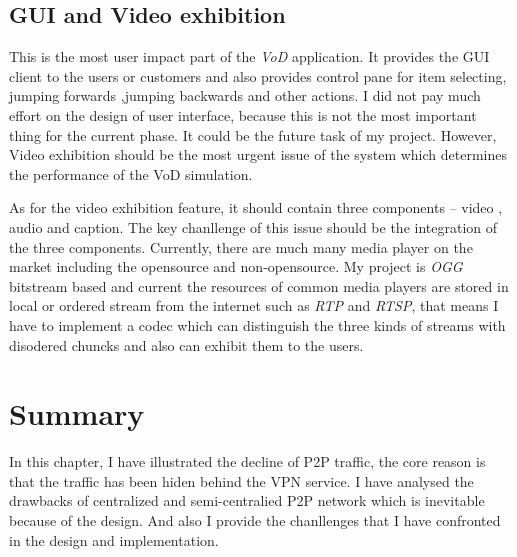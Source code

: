 \subsection{GUI and Video exhibition}
{
This is the most user impact part of the \emph{VoD} application. It provides the GUI client to the users or customers and also provides control pane for item selecting, jumping forwards ,jumping backwards and other actions.
I did not pay much effort on the design of user interface, because this is not the most important thing for the current phase. It could be the future task of my project.
However, Video exhibition should be the most urgent issue of the system which determines the performance of the VoD simulation.

As for the video exhibition feature, it should contain three components --  video , audio and caption.
The key chanllenge of this issue should be the integration of the three components.
Currently, there are much many media player on the market including the opensource and non-opensource.
My project is \emph{OGG} bitstream based and current the resources of common media players are stored in local or ordered stream from the internet such as \emph{RTP} and \emph{RTSP}, that means I have to implement a codec which can distinguish the three kinds of streams with disodered chuncks and also can exhibit them to the users.
}

\section{Summary}
{
In this chapter, I have illustrated the decline of P2P traffic, the core reason is that the traffic has been hiden behind the VPN service.
I have analysed the drawbacks of centralized and semi-centralied P2P network which is inevitable because of the design.
And also I provide the chanllenges that I have confronted in the design and implementation.

}
